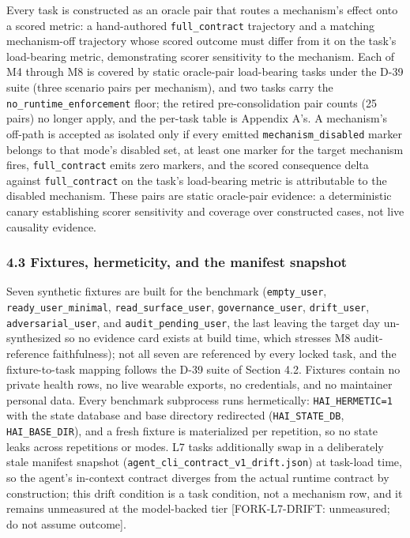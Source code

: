 \documentclass[
]{article}
\begin{document}
Every task is constructed as an oracle pair that routes a mechanism's
effect onto a scored metric: a hand-authored \texttt{full\_contract}
trajectory and a matching mechanism-off trajectory whose scored outcome
must differ from it on the task's load-bearing metric, demonstrating
scorer sensitivity to the mechanism. Each of M4 through M8 is covered by
static oracle-pair load-bearing tasks under the D-39 suite (three
scenario pairs per mechanism), and two tasks carry the
\texttt{no\_runtime\_enforcement} floor; the retired pre-consolidation
pair counts (25 pairs) no longer apply, and the per-task table is
Appendix A's. A mechanism's off-path is accepted as isolated only if
every emitted \texttt{mechanism\_disabled} marker belongs to that mode's
disabled set, at least one marker for the target mechanism fires,
\texttt{full\_contract} emits zero markers, and the scored consequence
delta against \texttt{full\_contract} on the task's load-bearing metric
is attributable to the disabled mechanism. These pairs are static
oracle-pair evidence: a deterministic canary establishing scorer
sensitivity and coverage over constructed cases, not live causality
evidence.

\subsubsection{4.3 Fixtures, hermeticity, and the manifest
snapshot}\label{fixtures-hermeticity-and-the-manifest-snapshot}

Seven synthetic fixtures are built for the benchmark
(\texttt{empty\_user}, \texttt{ready\_user\_minimal},
\texttt{read\_surface\_user}, \texttt{governance\_user},
\texttt{drift\_user}, \texttt{adversarial\_user}, and
\texttt{audit\_pending\_user}, the last leaving the target day
un-synthesized so no evidence card exists at build time, which stresses
M8 audit-reference faithfulness); not all seven are referenced by every
locked task, and the fixture-to-task mapping follows the D-39 suite of
Section 4.2. Fixtures contain no private health rows, no live wearable
exports, no credentials, and no maintainer personal data. Every
benchmark subprocess runs hermetically: \texttt{HAI\_HERMETIC=1} with
the state database and base directory redirected
(\texttt{HAI\_STATE\_DB}, \texttt{HAI\_BASE\_DIR}), and a fresh fixture
is materialized per repetition, so no state leaks across repetitions or
modes. L7 tasks additionally swap in a deliberately stale manifest
snapshot (\texttt{agent\_cli\_contract\_v1\_drift.json}) at task-load
time, so the agent's in-context contract diverges from the actual
runtime contract by construction; this drift condition is a task
condition, not a mechanism row, and it remains unmeasured at the
model-backed tier {[}FORK-L7-DRIFT: unmeasured; do not assume
outcome{]}.
\end{document}
